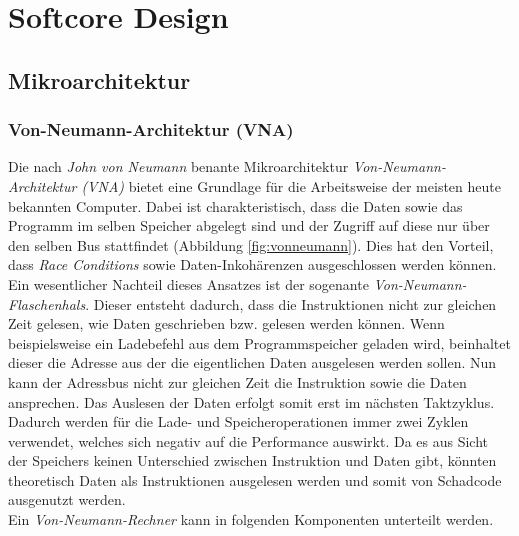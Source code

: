     \section{Softcore Design}

        \subsection{Mikroarchitektur}
                \subsubsection{Von-Neumann-Architektur (VNA)}
                    Die nach \textit{John von Neumann} benante Mikroarchitektur \textit{Von-Neumann-Architektur (VNA)}
                    bietet eine Grundlage für die Arbeitsweise der meisten heute bekannten Computer.
                    Dabei ist charakteristisch, dass die Daten sowie das Programm im selben Speicher abgelegt sind und
                    der Zugriff auf diese nur über den selben Bus stattfindet (Abbildung \ref{fig:vonneumann}).
                    Dies hat den Vorteil, dass \textit{Race Conditions} sowie Daten-Inkohärenzen ausgeschlossen werden können.
                    Ein wesentlicher Nachteil dieses Ansatzes ist der sogenante \textit{Von-Neumann-Flaschenhals}.
                    Dieser entsteht dadurch, dass die Instruktionen nicht zur gleichen Zeit gelesen,
                    wie Daten geschrieben bzw. gelesen werden können. Wenn beispielsweise ein Ladebefehl aus dem Programmspeicher
                    geladen wird, beinhaltet dieser die Adresse aus der die eigentlichen Daten ausgelesen werden sollen.
                    Nun kann der Adressbus nicht zur gleichen Zeit die Instruktion sowie die Daten ansprechen.
                    Das Auslesen der Daten erfolgt somit erst im nächsten Taktzyklus. Dadurch werden für
                    die Lade- und Speicheroperationen immer zwei Zyklen verwendet, welches sich
                    negativ auf die Performance auswirkt.
                    Da es aus Sicht der Speichers keinen Unterschied zwischen Instruktion und Daten gibt,
                    könnten theoretisch Daten als Instruktionen ausgelesen werden und somit von Schadcode ausgenutzt werden.\\
                    Ein \textit{Von-Neumann-Rechner} kann in folgenden Komponenten unterteilt werden.


